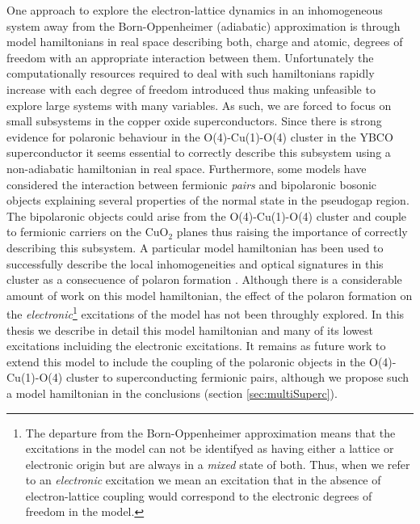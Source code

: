 One approach to explore the electron-lattice dynamics in an inhomogeneous system away from the Born-Oppenheimer (adiabatic) approximation is through model hamiltonians in real space describing both, charge and atomic, degrees of freedom with an appropriate interaction between them.
Unfortunately the computationally resources required to deal with such hamiltonians rapidly increase with each degree of freedom introduced thus making unfeasible to explore large systems with many variables.
As such, we are forced to focus on small subsystems in the copper oxide superconductors.
Since there is strong evidence for polaronic behaviour in the O(4)-Cu(1)-O(4) cluster \cite{MustredeLeon1992,Salkola1994} in the YBCO superconductor it seems essential to correctly describe this subsystem using a non-adiabatic hamiltonian in real space.
Furthermore, some models have considered the interaction between fermionic \textit{pairs} and bipolaronic bosonic objects \cite{Bussmann-Holder2005,Mihailovic2001,Bar-Yam1991,Bianconi2000} explaining several properties of the normal state in the pseudogap region. 
The bipolaronic objects could arise from the O(4)-Cu(1)-O(4) cluster and couple to fermionic carriers on the CuO$_2$ planes thus raising the importance of correctly describing this subsystem.
A particular model hamiltonian has been used to successfully describe the local inhomogeneities and optical signatures in this cluster as a consecuence of polaron formation \cite{MustredeLeon1992, Salkola1994, Salkola1995,DeLeon1999, Leon2008, MirandaMena2007,Mena2006,MustredeLeon2000}.
Although there is a considerable amount of work on this model hamiltonian, the effect of the polaron formation on the \textit{electronic}\footnote{The departure from the Born-Oppenheimer approximation means that the excitations in the model can not be identifyed as having either a lattice or electronic origin but are always in a \textit{mixed} state of both. Thus, when we refer to an \textit{electronic} excitation we mean an excitation that in the absence of electron-lattice coupling would correspond to the electronic degrees of freedom in the model.} excitations of the model has not been throughly explored.
In this thesis we describe in detail this model hamiltonian and many of its lowest excitations incluiding the electronic excitations.
It remains as future work to extend this model to include the coupling of the polaronic objects in the O(4)-Cu(1)-O(4) cluster to superconducting fermionic pairs, although we propose such a model hamiltonian in the conclusions (section \ref{sec:multiSuperc}).

